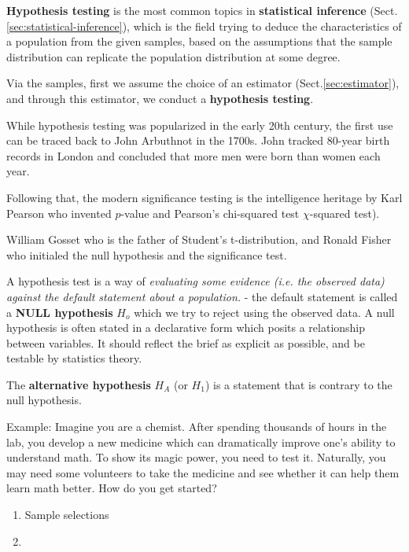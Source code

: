 {\bf Hypothesis testing} is the most common topics in {\bf statistical
inference} (Sect.\ref{sec:statistical-inference}), which is the field trying to
deduce the characteristics of a population from the given samples, based on
the assumptions that the sample distribution can replicate the population
distribution at some degree.
   
Via the samples, first we assume the choice of an  estimator
(Sect.\ref{sec:estimator}), and through this estimator, we conduct a {\bf
hypothesis testing}.

\begin{mdframed}
 
While hypothesis testing was popularized in the early 20th century, the first
use can be traced back to John Arbuthnot in the 1700s. John tracked 80-year
birth records in London and concluded that more men were born than women each
year.

Following that, the modern significance testing is the intelligence heritage by
Karl Pearson who invented $p$-value and Pearson’s chi-squared test
$\chi$-squared test).

William Gosset who is the father of Student’s t-distribution, and Ronald Fisher
who initialed the null hypothesis and the significance test.
\end{mdframed}

A hypothesis test is a way of  {\it evaluating some evidence (i.e. the observed
data) against the default statement about a population.} - the default statement
is called a {\bf NULL hypothesis} $H_o$ which we try to reject using the
observed data. A null hypothesis is often stated in a declarative form which
posits a relationship between variables. It should reflect the brief as explicit
as possible, and be testable by statistics theory.


The {\bf *alternative hypothesis} $H_A$ (or $H_1$) is a statement that is
contrary to the null hypothesis.

Example:
Imagine you are a chemist. After spending thousands of hours in the lab, you
develop a new medicine which can dramatically improve one's ability to
understand math. To show its magic power, you need to test it. Naturally, you
may need some volunteers to take the medicine and see whether it can help them
learn math better. How do you get started?
\begin{enumerate}
  \item  Sample selections
  
  \item 
\end{enumerate}

